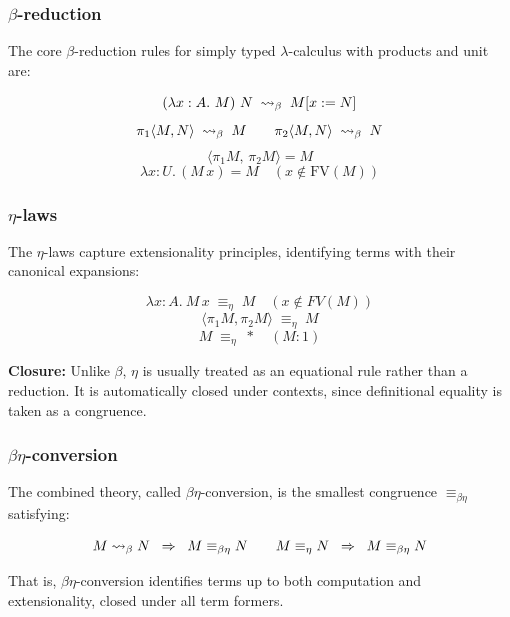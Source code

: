 \subsubsection{\centering $\beta$-reduction}

The core $\beta$-reduction rules for simply typed $\lambda$-calculus with products and unit are:

\[
  (\lambda x : A.\ M)\ N \;\mathrel{\leadsto}_\beta\; M[x:=N]
\]
\[
  \pi_1 \langle M, N \rangle \;\mathrel{\leadsto}_\beta\; M
  \qquad
  \pi_2 \langle M, N \rangle \;\mathrel{\leadsto}_\beta\; N
\]
\[
  \langle \pi_1 M,\, \pi_2 M\rangle = M
\]
\[
  \lambda x : U.\, (M\,x) = M \quad (x \not\in \mathrm{FV}(M))
\]

\subsubsection{\centering $\eta$-laws}

The $\eta$-laws capture extensionality principles, identifying terms with their canonical expansions:

\[
  \lambda x : A.\ M\,x \;\equiv_\eta\; M \quad (x \notin FV(M))
\]
\[
  \langle \pi_1 M, \pi_2 M \rangle \;\equiv_\eta\; M
\]
\[
  M \;\equiv_\eta\; * \quad (M : 1)
\]

\noindent
\textbf{Closure:}  
Unlike $\beta$, $\eta$ is usually treated as an equational rule rather than a reduction. It is automatically closed under contexts, since definitional equality is taken as a congruence.

\subsubsection{\centering $\beta\eta$-conversion}

The combined theory, called $\beta\eta$-conversion, is the smallest congruence $\equiv_{\beta\eta}$ satisfying:

\[
  M \mathrel{\leadsto}_\beta N \;\;\Rightarrow\;\; M \equiv_{\beta\eta} N
  \qquad
  M \equiv_\eta N \;\;\Rightarrow\;\; M \equiv_{\beta\eta} N
\]

That is, $\beta\eta$-conversion identifies terms up to both computation and extensionality, closed under all term formers.


